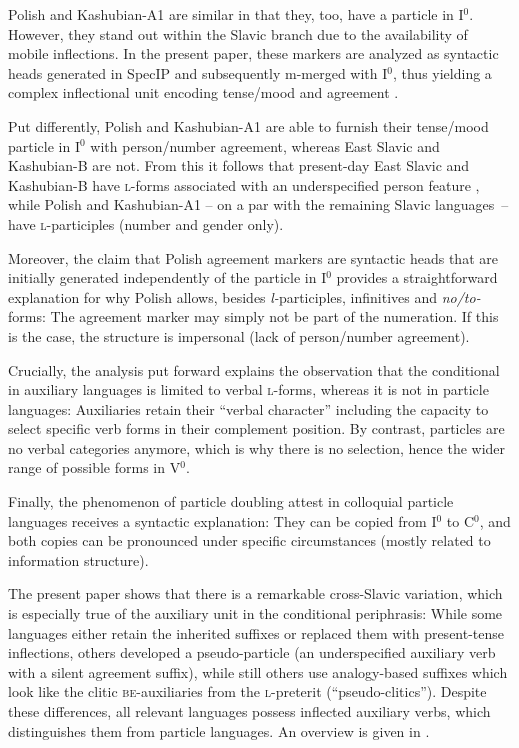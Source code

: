 \documentclass[output=paper]{langscibook}
\begin{document}
Polish and Kashubian-A1 are similar in that they, too, have a particle in I$^0$. However, they stand out within the Slavic branch due to the availability of mobile inflections. In the present paper, these markers are analyzed as syntactic heads generated in SpecIP and subsequently m-merged with I$^0$, thus yielding a complex inflectional unit encoding tense/mood and agreement \citep[see][]{Embick1995}. 

Put differently, Polish and Kashubian-A1 are able to furnish their tense/mood particle in I$^0$ with person/number agreement, whereas East Slavic and Kashubian-B are not. From this it follows that present-day East Slavic and Kashubian-B have \textsc{l-}forms associated with an underspecified person feature \citep[see][]{Junghanns1995}, while Polish and Kashubian-A1 -- on a par with the remaining Slavic languages~-- have \textsc{l-}participles (number and gender only). 

Moreover, the claim that Polish agreement markers are syntactic heads that are initially generated independently of the particle in I$^0$ provides a straightforward explanation for why Polish allows, besides \textit{l-}participles, infinitives and \textit{no/to-}forms: The agreement marker may simply not be part of the numeration. If this is the case, the structure is impersonal (lack of person/number agreement).

Crucially, the analysis put forward explains the observation that the conditional in auxiliary languages is limited to verbal \textsc{l-}forms, whereas it is not in particle languages: Auxiliaries retain their ``verbal character'' \citep{Issatchenko1940} including the capacity to select specific verb forms in their complement position. By contrast, particles are no verbal categories anymore, which is why there is no selection, hence the wider range of possible forms in V$^0$. 

Finally, the phenomenon of particle doubling attest in colloquial particle languages receives a syntactic explanation: They can be copied from I$^0$ to C$^0$, and both copies can be pronounced under specific circumstances (mostly related to information structure).

The present paper shows that there is a remarkable cross-Slavic variation, which is especially true of the auxiliary unit in the conditional periphrasis: While some languages either retain the inherited suffixes or replaced them with present-tense inflections, others developed a pseudo-particle (an underspecified auxiliary verb with a silent agreement suffix), while still others use analogy-based suffixes which look like the clitic \textsc{be}-auxiliaries from the \textsc{l-}preterit (``pseudo-clitics''). Despite these differences, all relevant languages possess inflected auxiliary verbs, which distinguishes them from particle languages. An overview is given in . 
\end{document}
